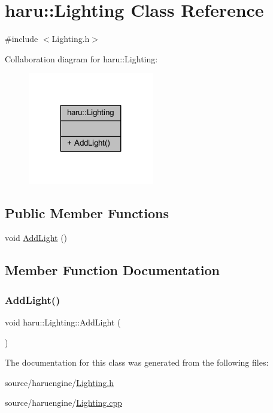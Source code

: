 \hypertarget{classharu_1_1_lighting}{}\section{haru\+:\+:Lighting Class Reference}
\label{classharu_1_1_lighting}


{\ttfamily \#include $<$Lighting.\+h$>$}



Collaboration diagram for haru\+:\+:Lighting\+:\nopagebreak
\begin{figure}[H]
\begin{center}
\leavevmode
\includegraphics[width=155pt]{classharu_1_1_lighting__coll__graph}
\end{center}
\end{figure}
\subsection*{Public Member Functions}
\begin{DoxyCompactItemize}
\item 
void \mbox{\hyperlink{classharu_1_1_lighting_adeffec2cf38f48333986509af76df041}{Add\+Light}} ()
\end{DoxyCompactItemize}


\subsection{Member Function Documentation}
\mbox{\label{classharu_1_1_lighting_adeffec2cf38f48333986509af76df041}} 
\subsubsection{\texorpdfstring{Add\+Light()}{AddLight()}}
{\footnotesize\ttfamily void haru\+::\+Lighting\+::\+Add\+Light (\begin{DoxyParamCaption}{ }\end{DoxyParamCaption})}



The documentation for this class was generated from the following files\+:\begin{DoxyCompactItemize}
\item 
source/haruengine/\mbox{\hyperlink{_lighting_8h}{Lighting.\+h}}\item 
source/haruengine/\mbox{\hyperlink{_lighting_8cpp}{Lighting.\+cpp}}\end{DoxyCompactItemize}
